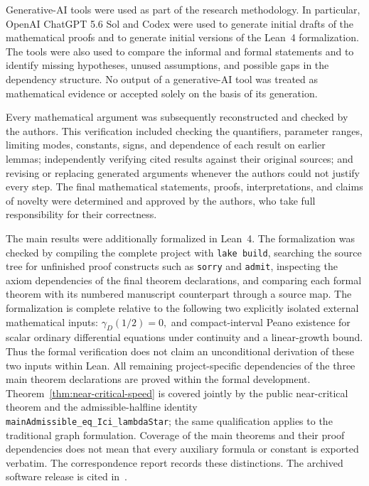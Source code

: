 \documentclass[12pt]{amsart}
\numberwithin{equation}{section}
\theoremstyle{plain}
\theoremstyle{definition}
\begin{document}
Generative-AI tools were used as part of the research methodology.
In particular, OpenAI ChatGPT 5.6 Sol and Codex
were used to generate initial drafts of the mathematical proofs and to generate
initial versions of the Lean~4 formalization.  The tools were also used
to compare the informal and formal statements and to identify missing
hypotheses, unused assumptions, and possible gaps in the dependency
structure.  No output of a generative-AI tool was treated as mathematical
evidence or accepted solely on the basis of its generation.

Every mathematical argument was subsequently reconstructed and checked
by the authors.  This verification included checking the quantifiers,
parameter ranges, limiting modes, constants, signs, and dependence of
each result on earlier lemmas; independently verifying cited results
against their original sources; and revising or replacing generated
arguments whenever the authors could not justify every step.  The final
mathematical statements, proofs, interpretations, and claims of novelty
were determined and approved by the authors, who take full responsibility
for their correctness.

The main results were additionally formalized in Lean~4.  The
formalization was checked by compiling the complete project with
\texttt{lake build}, searching the source tree for unfinished proof
constructs such as \texttt{sorry} and \texttt{admit}, inspecting the
axiom dependencies of the final theorem declarations, and comparing
each formal theorem with its numbered manuscript counterpart through a
source map.  The formalization is complete relative to the following
two explicitly isolated external mathematical inputs:
\(    \gamma_D(1/2)=0, \)
and compact-interval Peano existence for scalar ordinary differential
equations under continuity and a linear-growth bound.  Thus the
formal verification does not claim an unconditional derivation of
these two inputs within Lean.  All remaining project-specific
dependencies of the three main theorem declarations are proved within
the formal development. Theorem~\ref{thm:near-critical-speed} is covered
jointly by the public near-critical theorem and the admissible-halfline identity
\texttt{mainAdmissible\_eq\_Ici\_lambdaStar}; the same qualification applies
to the traditional graph formulation. Coverage of the main theorems and their
proof dependencies does not mean that every auxiliary formula or constant is
exported verbatim. The correspondence report records these distinctions.
The archived software release is cited in~\cite{DingHeLiangZheng2026Software}.
\end{document}
